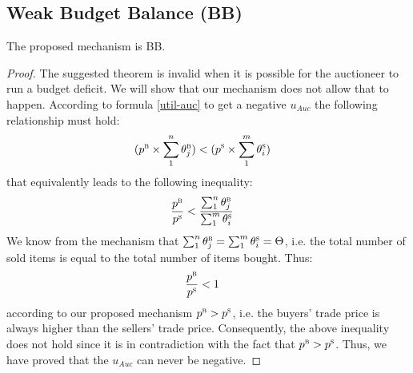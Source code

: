\subsection{Weak Budget Balance (BB)}
\begin{Theorem}
The proposed mechanism is BB.
\end{Theorem}
\begin{proof}
The suggested theorem is invalid when it is possible for the auctioneer to run a budget deficit. We will show that our mechanism does not allow that to happen.
According to formula \ref{util-auc} to get a negative $u_{Auc}$ the following relationship must hold:
\begin{align*}
(p^\textsc{b} \times \sum_{1}^n {\theta_{j}^\textsc{b}}) &< (p^\textsc{s} \times \sum_{1}^m {\theta_{i}^\textsc{s}})
\end{align*}
that equivalently leads to the following inequality:
\begin{align*}
\frac{p^\textsc{b}}{p^\textsc{s}} &< \frac{\sum_{1}^n {\theta_{j}^\textsc{b}}}{\sum_{1}^m {\theta_{i}^\textsc{s}}}
\end{align*}
We know from the mechanism that $\sum_{1}^n {\theta_{j}^\textsc{b}}=\sum_{1}^m {\theta_{i}^\textsc{s}}=\Theta$, i.e. the total number of sold items is equal to the total number of items bought. Thus:
\begin{align*}
\frac{p^\textsc{b}}{p^\textsc{s}} &< 1 \qedhere
\end{align*}
according to our proposed mechanism ${p^\textsc{b}}>{p^\textsc{s}}$, i.e. the buyers' trade price is always higher than the sellers' trade price. Consequently, the above inequality does not hold since it is in contradiction with the fact that ${p^\textsc{b}}>{p^\textsc{s}}$. Thus, we have proved that the $u_{Auc}$ can never be negative.
\end{proof}

